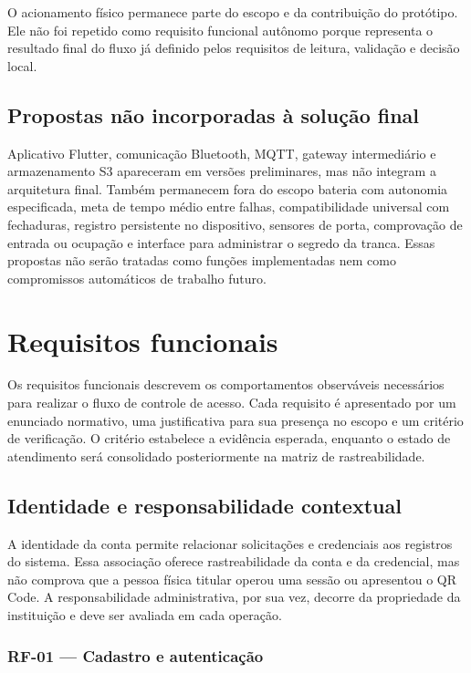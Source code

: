 O acionamento físico permanece parte do escopo e da contribuição do protótipo. Ele não foi repetido como requisito funcional autônomo porque representa o resultado final do fluxo já definido pelos requisitos de leitura, validação e decisão local.

\subsection{Propostas não incorporadas à solução final}

Aplicativo Flutter, comunicação Bluetooth, MQTT, gateway intermediário e armazenamento S3 apareceram em versões preliminares, mas não integram a arquitetura final. Também permanecem fora do escopo bateria com autonomia especificada, meta de tempo médio entre falhas, compatibilidade universal com fechaduras, registro persistente no dispositivo, sensores de porta, comprovação de entrada ou ocupação e interface para administrar o segredo da tranca. Essas propostas não serão tratadas como funções implementadas nem como compromissos automáticos de trabalho futuro.

\section{Requisitos funcionais}

Os requisitos funcionais descrevem os comportamentos observáveis necessários para realizar o fluxo de controle de acesso. Cada requisito é apresentado por um enunciado normativo, uma justificativa para sua presença no escopo e um critério de verificação. O critério estabelece a evidência esperada, enquanto o estado de atendimento será consolidado posteriormente na matriz de rastreabilidade.

\subsection{Identidade e responsabilidade contextual}

A identidade da conta permite relacionar solicitações e credenciais aos registros do sistema. Essa associação oferece rastreabilidade da conta e da credencial, mas não comprova que a pessoa física titular operou uma sessão ou apresentou o QR Code. A responsabilidade administrativa, por sua vez, decorre da propriedade da instituição e deve ser avaliada em cada operação.

\subsubsection*{RF-01 --- Cadastro e autenticação}

